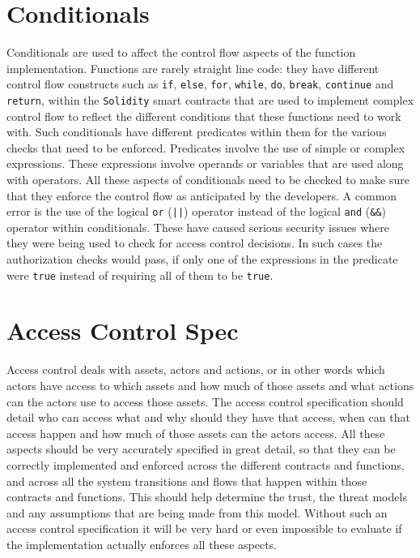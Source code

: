 \section{Conditionals}
Conditionals are used to affect the control flow aspects of the function implementation. Functions are rarely straight line code: they have different control flow constructs such as \verb|if|, \verb|else|, \verb|for|, \verb|while|, \verb|do|, \verb|break|, \verb|continue| and \verb|return|, within the \verb|Solidity| smart contracts that are used to implement complex control flow to reflect the different conditions that these functions need to work with. Such conditionals have different predicates within them for the various checks that need to be enforced. Predicates involve the use of simple or complex expressions. These expressions involve operands or variables that are used along with operators. All these aspects of conditionals need to be checked to make sure that they enforce the control flow as anticipated by the developers. A common error is the use of the logical \verb|or| (\verb!||!) operator instead of the logical \verb|and| (\verb|&&|) operator within conditionals. These have caused serious security issues where they were being used to check for access control decisions. In such cases the authorization checks would pass, if only one of the expressions in the predicate were \verb|true| instead of requiring all of them to be \verb|true|.

\section{Access Control Spec}
Access control deals with assets, actors and actions, or in other words which actors have access to which assets and how much of those assets and what actions can the actors use to access those assets. The access control specification should detail who can access what and why should they have that access, when can that access happen and how much of those assets can the actors access. All these aspects should be very accurately specified in great detail, so that they can be correctly implemented and enforced across the different contracts and functions, and across all the system transitions and flows that happen within those contracts and functions. This should help determine the trust, the threat models and any assumptions that are being made from this model. Without such an access control specification it will be very hard or even impossible to evaluate if the implementation actually enforces all these aspects.

